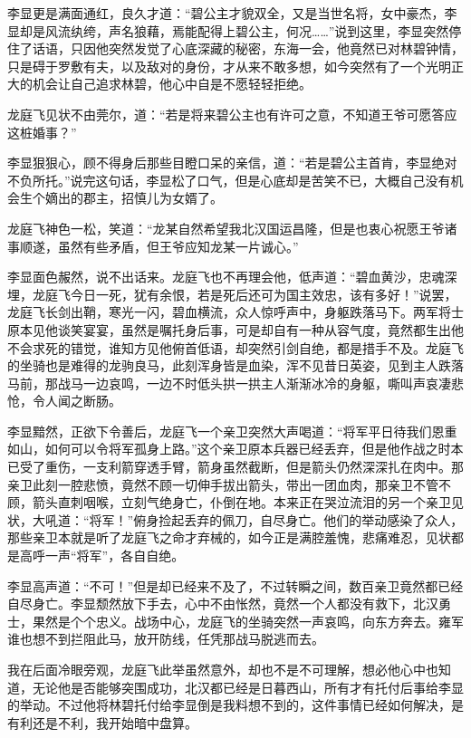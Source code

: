 李显更是满面通红，良久才道：“碧公主才貌双全，又是当世名将，女中豪杰，李显却是风流纨绔，声名狼藉，焉能配得上碧公主，何况……”说到这里，李显突然停住了话语，只因他突然发觉了心底深藏的秘密，东海一会，他竟然已对林碧钟情，只是碍于罗敷有夫，以及敌对的身份，才从来不敢多想，如今突然有了一个光明正大的机会让自己追求林碧，他心中自是不愿轻轻拒绝。

龙庭飞见状不由莞尔，道：“若是将来碧公主也有许可之意，不知道王爷可愿答应这桩婚事？”

李显狠狠心，顾不得身后那些目瞪口呆的亲信，道：“若是碧公主首肯，李显绝对不负所托。”说完这句话，李显松了口气，但是心底却是苦笑不已，大概自己没有机会生个嫡出的郡主，招慎儿为女婿了。

龙庭飞神色一松，笑道：“龙某自然希望我北汉国运昌隆，但是也衷心祝愿王爷诸事顺遂，虽然有些矛盾，但王爷应知龙某一片诚心。”

李显面色赧然，说不出话来。龙庭飞也不再理会他，低声道：“碧血黄沙，忠魂深埋，龙庭飞今日一死，犹有余恨，若是死后还可为国主效忠，该有多好！”说罢，龙庭飞长剑出鞘，寒光一闪，碧血横流，众人惊呼声中，身躯跌落马下。两军将士原本见他谈笑宴宴，虽然是嘱托身后事，可是却自有一种从容气度，竟然都生出他不会求死的错觉，谁知方见他俯首低语，却突然引剑自绝，都是措手不及。龙庭飞的坐骑也是难得的龙驹良马，此刻浑身皆是血染，浑不见昔日英姿，见到主人跌落马前，那战马一边哀鸣，一边不时低头拱一拱主人渐渐冰冷的身躯，嘶叫声哀凄悲怆，令人闻之断肠。

李显黯然，正欲下令善后，龙庭飞一个亲卫突然大声喝道：“将军平日待我们恩重如山，如何可以令将军孤身上路。”这个亲卫原本兵器已经丢弃，但是他作战之时本已受了重伤，一支利箭穿透手臂，箭身虽然截断，但是箭头仍然深深扎在肉中。那亲卫此刻一腔悲愤，竟然不顾一切伸手拔出箭头，带出一团血肉，那亲卫不管不顾，箭头直刺咽喉，立刻气绝身亡，仆倒在地。本来正在哭泣流泪的另一个亲卫见状，大吼道：“将军！”俯身捡起丢弃的佩刀，自尽身亡。他们的举动感染了众人，那些亲卫本就是听了龙庭飞之命才弃械的，如今正是满腔羞愧，悲痛难忍，见状都是高呼一声“将军”，各自自绝。

李显高声道：“不可！”但是却已经来不及了，不过转瞬之间，数百亲卫竟然都已经自尽身亡。李显颓然放下手去，心中不由怅然，竟然一个人都没有救下，北汉勇士，果然是个个忠义。战场中心，龙庭飞的坐骑突然一声哀鸣，向东方奔去。雍军谁也想不到拦阻此马，放开防线，任凭那战马脱逃而去。

我在后面冷眼旁观，龙庭飞此举虽然意外，却也不是不可理解，想必他心中也知道，无论他是否能够突围成功，北汉都已经是日暮西山，所有才有托付后事给李显的举动。不过他将林碧托付给李显倒是我料想不到的，这件事情已经如何解决，是有利还是不利，我开始暗中盘算。

